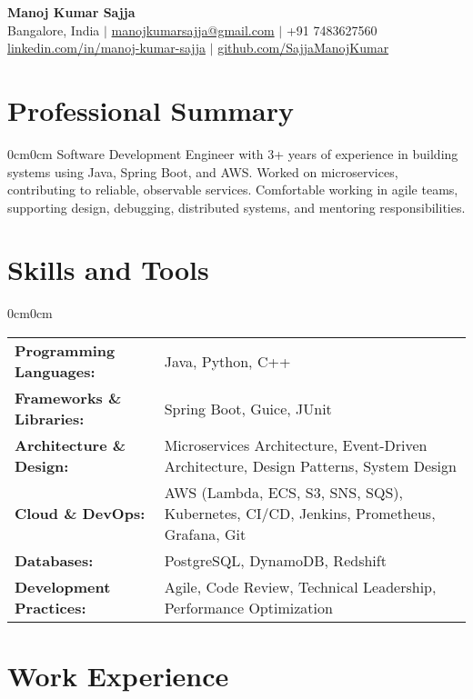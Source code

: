 \documentclass[8.5pt, letterpaper]{article}
\newenvironment{onecolentry}{\begin{adjustwidth}{0cm}{0cm}\vspace{0.5pt}}{\end{adjustwidth}\vspace{1.5pt}}
\begin{document}
    \begin{center}
{\Large \textbf{Manoj Kumar Sajja}} \\[0.1cm]
\small
Bangalore, India \quad $\vert$ \quad
\href{mailto:manojkumarsajja@gmail.com}{manojkumarsajja@gmail.com} \quad $\vert$ \quad
+91 7483627560 \\[0.03cm]
\href{https://linkedin.com/in/manoj-kumar-sajja}{linkedin.com/in/manoj-kumar-sajja} \quad $\vert$ \quad
\href{https://github.com/SajjaManojKumar}{github.com/SajjaManojKumar}
\end{center}

\section{Professional Summary}
\begin{onecolentry}
Software Development Engineer with 3+ years of experience in building systems using Java, Spring Boot, and AWS. Worked on microservices, contributing to reliable, observable services. Comfortable working in agile teams, supporting design, debugging, distributed systems, and mentoring responsibilities.
\end{onecolentry}

\section{Skills and Tools}
\begin{onecolentry}
\begin{tabularx}{\linewidth}{@{}lX@{}}
\textbf{Programming Languages:} & Java, Python, C++ \\
\textbf{Frameworks \& Libraries:} & Spring Boot, Guice, JUnit \\
\textbf{Architecture \& Design:} & Microservices Architecture, Event-Driven Architecture, Design Patterns, System Design \\
\textbf{Cloud \& DevOps:} & AWS (Lambda, ECS, S3, SNS, SQS), Kubernetes, CI/CD, Jenkins, Prometheus, Grafana, Git \\
\textbf{Databases:} & PostgreSQL, DynamoDB, Redshift \\
\textbf{Development Practices:} & Agile, Code Review, Technical Leadership, Performance Optimization \\
\end{tabularx}
\end{onecolentry}

\section{Work Experience}
\end{document}
